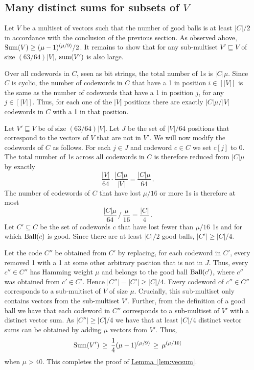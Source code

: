 \documentclass[11pt]{article}
\numberwithin{equation}{section}
\theoremstyle{definition}
\theoremstyle{plain}
\newcommand{\expref}[2]{\hyperref[#2]{#1~\ref{#2}}}
\newcommand{\ball}[1]{\ensuremath{\textup{Ball}(#1)}}
\newcommand{\Vsum}{\ensuremath{\textup{Sum}}}
\newcommand{\vsum}{\ensuremath{\textup{sum}}}
\newcommand{\ELL}{\ensuremath{\mu}}
\begin{document}
\subsection{Many distinct sums for subsets of \texorpdfstring{$V$}{V}}

Let $V$ be a multiset of vectors such that the number of good balls is at least $|C|/2$ in accordance with the conclusion of the previous section. As observed above, $\Vsum(V)\geq (\ELL-1)^{(\ELL/9)}/2$. 
It remains to show that for any sub-multiset $V' \sqsubseteq V$ of size $(63/64)|V|$, $\vsum(V')$ is also large.

Over all codewords in $C$, seen as bit strings, the total number of 1s is $|C|\ELL$. Since $C$ is cyclic, the number of codewords in $C$ that have a 1 in position $i\in [|V|]$ is the same as the number of codewords that have a 1 in position $j$, for any $j\in [|V|]$.
Thus, for each one of the $|V|$ positions there are exactly $|C|\ELL/|V|$ codewords in $C$ with a 1 in that position.

Let $V'\sqsubseteq V$ be of size $(63/64)|V|$. Let $J$ be the set of $|V|/64$ positions that correspond to the vectors of $V$ that are not in $V'$.
We will now modify the codewords of $C$ as follows.
For each $j\in J$ and codeword $c\in C$ we
set $c[j]$ to 0.
The total number of 1s across all codewords in $C$ is therefore reduced from $|C|\mu$ by exactly
\[
\frac{|V|}{64} \cdot
\frac{|C|\ELL}{|V|} = \frac{|C|\ELL}{64}\,.
\]
The number of codewords of $C$ that have lost $\ELL/16$ or more 1s is
therefore at most
\[
\frac{|C|\ELL}{64}\,\Big/\,\frac{\ELL}{16}=\frac{|C|}4\,.
\]
Let $C'\subseteq C$ be the set of codewords $c$
that have lost fewer than $\ELL/16$ 1s and for which $\ball{c}$ is good. Since there are at least $|C|/2$
good balls, $|C'|\geq |C|/4$.

Let the code $C''$ be obtained from $C'$ by replacing, for each codeword in $C'$, every removed 1 with a 1 at some other arbitrary position that is not in $J$.
Thus, every $c''\in C''$ has Hamming weight $\ELL$ and belongs to the good ball $\ball{c'}$, where $c''$ was obtained from $c'\in C'$.
Hence $|C''|=|C'|\geq |C|/4$. Every codeword of $c'' \in C''$ corresponds to a sub-multiset of $V$ of size $\ELL$. Crucially, this sub-multiset only contains vectors from the sub-multiset $V'$. Further, from the definition of a good ball we have that each codeword in $C''$ corresponds to a sub-multiset of $V'$ with a distinct vector sum. As $|C''|\geq |C|/4$ we have that at least $|C|/4$ distinct vector sums can be
obtained by adding $\ELL$ vectors from $V'$.
Thus,
\[
\Vsum(V')
\,\geq\,
\frac14 (\ELL-1)^{(\ELL/9)}
\,\geq\,
\ELL^{(\ELL/10)}
\]
when $\ELL>40$. This completes the proof of \expref{Lemma}{lem:vecsum}.
\end{document}
